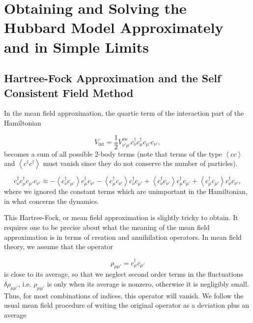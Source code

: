 \chapter{Obtaining and Solving the Hubbard Model Approximately and in Simple Limits}
\label{ap:hubbardObSol}

\pagebreak

\section{Hartree-Fock Approximation and the Self Consistent Field Method}\label{sec:hartree-fock}

In the mean field approximation, the quartic term of the interaction part of the Hamiltonian

\begin{equation*}
V_{\text{int}} = \frac{1}{2} V^{\nu\mu}_{\nu'\mu'} c_\nu^\dagger c_\mu^\dagger c_{\mu'} c_{\nu'} ,
\end{equation*} 
becomes a sum of all possible 2-body terms (note that terms of the type $\left\langle cc \right\rangle$ and $\left\langle c^\dagger c^\dagger \right\rangle$ must vanish since they do not conserve the number of particles).

\begin{equation}\label{eq:c_mft}
c_\nu^\dagger c_\mu^\dagger c_{\mu'} c_{\nu'} \approx - \left\langle c_\nu^\dagger c_{\mu'} \right\rangle  c_{\mu}^\dagger c_{\nu'} - \left\langle c_{\mu}^\dagger c_{\nu'} \right\rangle c_{\nu}^\dagger c_{\mu'} + \left\langle c_{\nu}^\dagger c_{\nu'} \right\rangle  c_{\mu}^\dagger c_{\mu'} + \left\langle c_{\mu}^\dagger c_{\mu'} \right\rangle  c_{\nu}^\dagger c_{\nu'} ,
\end{equation}
where we ignored the constant terms which are unimportant in the Hamiltonian, in what concerns the dynamics. 

This Hartree-Fock, or mean field approximation is slightly tricky to obtain. It requires one to be precise about what the meaning of the mean field approximation is in terms of creation and annihilation operators. In mean field theory, we assume that the operator

\begin{equation}
\rho_{\mu\mu'} = c_{\mu}^\dagger c_{\mu'}
\end{equation}
is close to its average, so that we neglect second order terms in the fluctuations $\delta \rho_{\mu\mu'}$, i.e. $\rho_{\mu\mu'}$ is  only when its average is nonzero, otherwise it is negligibly small. Thus, for most combinations of indices, this operator will vanish. We follow the usual mean field procedure of writing the original operator as a deviation plus an average

